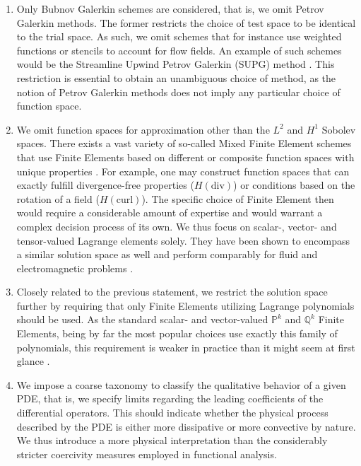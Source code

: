 \documentclass[asi,article,submit,moreauthors]{Definitions/mdpi}
\begin{document}
\begin{enumerate}
    \item Only Bubnov Galerkin schemes are considered, that is, we omit Petrov Galerkin methods.
    The former restricts the choice of test space to be identical to the trial space.
    As such, we omit schemes that for instance use weighted functions or stencils to account for flow fields.
    An example of such schemes would be the Streamline Upwind Petrov Galerkin (SUPG) method \cite{brooksStreamlineUpwindPetrovGalerkin1982}.
    This restriction is essential to obtain an unambiguous choice of method, as the notion of Petrov Galerkin methods does not imply any particular choice of function space.
    \item We omit function spaces for approximation other than the $L^2$ and $H^1$ Sobolev spaces.
    There exists a vast variety of so-called Mixed Finite Element schemes that use Finite Elements based on different or composite function spaces with unique properties \cite{ernTheoryPracticeFinite2004}.
    For example, one may construct function spaces that can exactly fulfill divergence-free properties ($H(\text{div})$) or conditions based on the rotation of a field ($H(\text{curl})$).
    The specific choice of Finite Element then would require a considerable amount of expertise and would warrant a complex decision process of its own.
    We thus focus on scalar-, vector- and tensor-valued Lagrange elements solely.
    They have been shown to encompass a similar solution space as well and perform comparably for fluid and electromagnetic problems \cite{cockburnLocallyDivergencefreeDiscontinuous2004,hughesStabilizedMixedDiscontinuous2006}.
    \item Closely related to the previous statement, we restrict the solution space further by requiring that only Finite Elements utilizing Lagrange polynomials should be used.
    As the standard scalar- and vector-valued $\mathbb{P}^k$ and $\mathbb{Q}^k$ Finite Elements, being by far the most popular choices use exactly this family of polynomials, this requirement is weaker in practice than it might seem at first glance \cite{lagrange-0,lagrange-1}.
    \item We impose a coarse taxonomy to classify the qualitative behavior of a given PDE, that is, we specify limits regarding the leading coefficients of the differential operators.
    This should indicate whether the physical process described by the PDE is either more dissipative or more convective by nature. 
    We thus introduce a more physical interpretation than the considerably stricter coercivity measures employed in functional analysis.

\end{enumerate}
\end{document}
